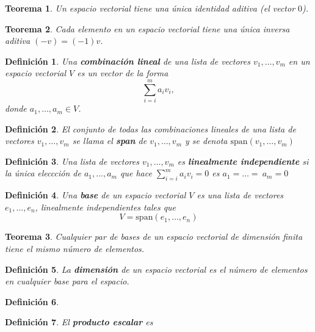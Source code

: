 \documentclass[a4paper,12pt]{article}
\newtheorem{teo}{Teorema}
\newtheorem{defi}{Definición}
\begin{document}
\begin{teo}
    Un espacio vectorial tiene una única identidad aditiva (el vector $0$).
\end{teo}

\begin{teo}
    Cada elemento en un espacio vectorial tiene una única inversa aditiva $(-v)=(-1)v$.
\end{teo}

\begin{defi} Una {\bf combinación lineal} de una lista de vectores $v_1,\ldots,v_m$ en un espacio vectorial $V$ es un vector de la forma
    \[\sum_{i=i}^{m}a_i v_i,\]
donde $a_1,\ldots,a_m\in V$.
\end{defi}

\begin{defi}
    El conjunto de todas las combinaciones lineales de una lista de vectores $v_1,\ldots,v_m$ se llama el {\bf \em span} de $v_1,\ldots,v_m$ y se denota $\mathrm{span}(v_1,\ldots,v_m)$
\end{defi}

\begin{defi}
    Una lista de vectores $v_1,\ldots,v_m$ es {\bf linealmente independiente} si la única eleccción de $a_1,\ldots,a_m$ que hace $\sum_{i=i}^{m}a_i v_i=0$ es $a_1 =\ldots =\ a_m = 0$
\end{defi}

\begin{defi} Una {\bf base} de un espacio vectorial $V$ es una lista de vectores $e_1,\ldots,e_n$, linealmente independientes tales que 
    \[V=\mathrm{span}(e_1,\ldots,e_n)\] 
\end{defi}

\begin{teo}
    Cualquier par de bases de un espacio vectorial de dimensión finita tiene el mismo número de elementos.
\end{teo}

\begin{defi}
    La {\bf dimensión} de un espacio vectorial es el número de elementos en cualquier base para el espacio.
\end{defi}

\begin{defi}

\end{defi}

\begin{defi}
    El {\bf producto escalar} es 
\end{defi}
\end{document}
